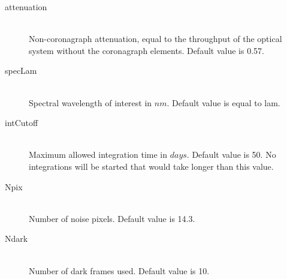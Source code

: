 \documentclass[cleanfoot]{asme2ej}
\begin{document}
\begin{itemize}
\begin{description}
    \item[attenuation] \hfill \\
    Non-coronagraph attenuation, equal to the throughput of the optical system without the coronagraph elements. Default value is 0.57.
    \item[specLam] \hfill \\
    Spectral wavelength of interest in $ nm $. Default value is equal to lam.
    \item[intCutoff] \hfill \\
    Maximum allowed integration time in $ days $. Default value is 50. No integrations will be started that would take longer than this value.
    \item[Npix] \hfill \\
    Number of noise pixels. Default value is 14.3.
    \item[Ndark] \hfill \\
    Number of dark frames used. Default value is 10.


\end{description}
\end{itemize}
\end{document}
